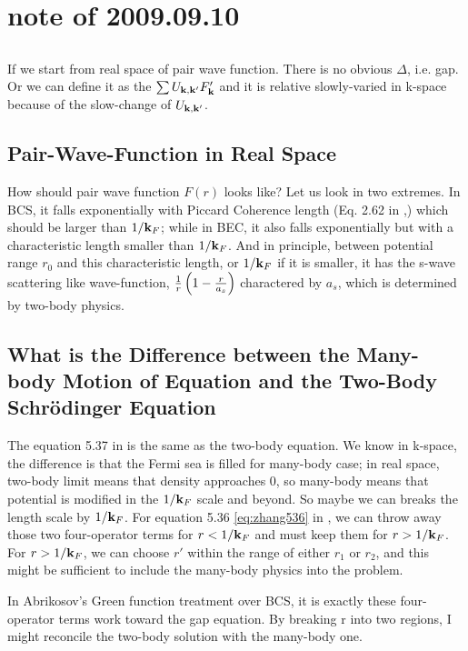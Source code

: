 \section{note of 2009.09.10}
\subsection{}
If we start from real space of pair wave function.  There is no obvious $\Delta$, i.e. gap.  Or we can define it as the $\sum{{U_{\ensuremath{\mathbf{k}},\ensuremath{\mathbf{k}}'}}F_{\ensuremath{\mathbf{k}}}'}$  and it is relative slowly-varied in k-space because of the slow-change of $U_{\mathbf{k},\mathbf{k}'}$.

\subsection{Pair-Wave-Function in Real Space}

How should pair wave function $F(r)$ looks like?  Let us look in two extremes. In BCS, it falls exponentially  with Piccard Coherence length (Eq. 2.62 in \cite{ZhangThesis},\cite{Leggett}) which should be larger than $1/\mathbf{k}_F$; while in BEC, it also falls exponentially but with a  characteristic length  smaller than $1/\mathbf{k}_F$.  And in principle, between potential range $r_0$ and this characteristic length, or $1/\mathbf{k}_F$ if it is smaller, it has the s-wave scattering like wave-function, $\frac{1}{r}\left(1-\frac{r}{a_s}\right)$ charactered by $a_s$, which is determined by two-body physics.   

\subsection{What is the Difference between the Many-body Motion of Equation and the Two-Body Schr\"odinger Equation\label{subsec:twoR}}
The equation 5.37 in \cite{ZhangThesis} is the same as the two-body equation.  We know in k-space, the difference is that the Fermi sea is filled for many-body case; in real space, two-body limit means that density approaches 0, so many-body means that potential is modified in the $1/\mathbf{k}_F$ scale and beyond. So maybe we can breaks the length scale by $1/\mathbf{k}_F$.  For equation 5.36 \eqref{eq:zhang536} in \cite{ZhangThesis}, we can throw away those two four-operator terms for $r<1/\mathbf{k}_F$ and must keep them for $r>1/\mathbf{k}_F$.  For $r>1/\mathbf{k}_F$, we can choose $r'$ within the range of either $r_1$ or $r_2$, and this might be sufficient to include the many-body physics into the problem.

In Abrikosov's Green function treatment over BCS, it is exactly these four-operator terms work toward the gap equation.  By breaking r into two regions, I might reconcile the two-body solution with the many-body one.  

